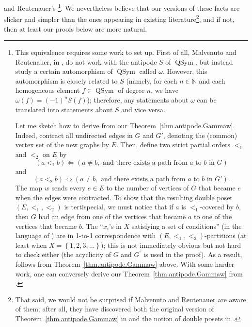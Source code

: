 \documentclass[numbers=enddot,12pt,final,onecolumn,notitlepage,abstracton]{scrartcl}
\theoremstyle{definition}
\newcommand{\QSym}{{\operatorname{QSym}}}
\newcommand{\NN}{{\mathbb{N}}}
\begin{document}
and Reutenauer's \cite[Theorem 3.1]{Mal-Reu}\footnote{This equivalence
requires some work to set up. First of all, Malvenuto and
Reutenauer, in \cite{Mal-Reu}, do not work with the antipode $S$
of $\QSym$, but instead study a certain automorphism of
$\QSym$ called $\omega$. However, this automorphism is closely
related to $S$ (namely, for each $n \in \NN$ and each homogeneous
element $f \in \QSym$ of degree $n$, we have
$\omega\left(f\right) = \left(-1\right)^n S\left(f\right)$);
therefore, any statements about $\omega$ can be translated into
statements about $S$ and vice versa.
\par
Let me sketch how to derive \cite[Theorem 3.1]{Mal-Reu}
from our Theorem~\ref{thm.antipode.Gammaw}. Indeed, contract
all undirected edges in $G$ and $G'$,
denoting the (common) vertex set of the new graphs by $E$.
Then, define two strict partial orders $<_1$ and
$<_2$ on $E$ by
\[
\left(a <_1 b\right) \Longleftrightarrow \left(a \neq b,
\text{ and there exists a path from } a \text{ to } b \text{ in }
G \right)
\]
and
\[
\left(a <_2 b\right) \Longleftrightarrow \left(a \neq b,
\text{ and there exists a path from } a \text{ to } b \text{ in }
G' \right) .
\]
The map $w$ sends every $e \in E$ to the number of vertices
of $G$ that became $e$ when the edges were contracted. To show that
the resulting double poset $\left(E, <_1, <_2\right)$ is
tertispecial, we must notice that if $a$ is $<_1$-covered by $b$,
then $G$ had an edge from one of the vertices that became $a$ to
one of the vertices that became $b$. The ``$x_i$'s in $X$
satisfying a set of conditions'' (in the language of
\cite[Section 3]{Mal-Reu}) are in 1-to-1 correspondence with
$\left(E, <_1, <_2\right)$-partitions (at least when
$X = \left\{1, 2, 3, \ldots\right\}$); this is not immediately
obvious but not hard to check either (the acyclicity of $G$ and
$G^\prime$ is used in the proof). As a result,
\cite[Theorem 3.1]{Mal-Reu} follows from
Theorem~\ref{thm.antipode.Gammaw} above.
With some harder work, one can conversely derive
our Theorem~\ref{thm.antipode.Gammaw} from
\cite[Theorem 3.1]{Mal-Reu}.}. We
nevertheless believe that our versions of these facts are
slicker and simpler than the ones appearing in existing
literature\footnote{That said, we would not be surprised if
Malvenuto and Reutenauer are aware of them; after all, they have
discovered both the original
version of Theorem~\ref{thm.antipode.Gammaw} in
\cite{Mal-Reu} and the notion of double posets in \cite{Mal-Reu-DP}.},
and if not,
then at least our proofs below are more natural.
\end{document}
